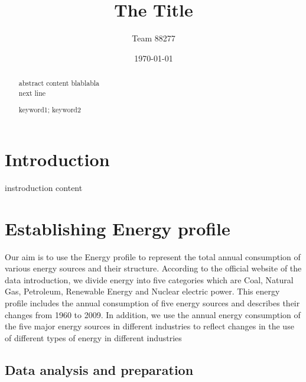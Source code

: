 \documentclass{mcmthesis}
\title{The Title}
\author{Team 88277}
\date{\today}
\begin{document}
\begin{abstract}
abstract content blablabla \\
next line
\begin{keywords}
keyword1; keyword2
\end{keywords}

\end{abstract}

\maketitle                  %
\tableofcontents
\section{Introduction}
instroduction content
\section{Establishing Energy profile}
Our aim is to use the Energy profile to represent the total annual consumption of various energy
sources and their structure. According to the official website of the data introduction,
we divide energy into five categories which are Coal, Natural Gas, Petroleum, Renewable Energy and Nuclear electric power.
This energy profile includes the annual consumption of five energy sources and describes their changes from 1960 to 2009.
In addition, we use the annual energy consumption of the five major energy sources
in different industries to reflect changes in the use of different types of energy in different industries
\subsection{Data analysis and preparation}
\end{document}
